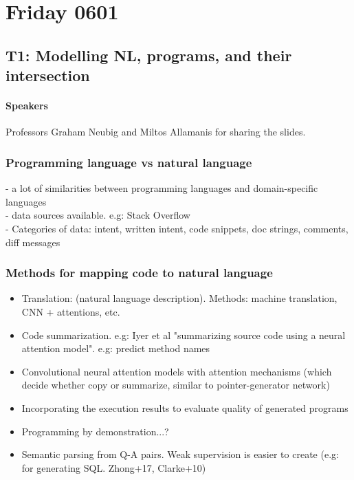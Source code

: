 
\section{Friday 0601}

\subsection{T1: Modelling NL, programs, and their intersection}

\paragraph{Speakers} Professors Graham Neubig and Miltos Allamanis for sharing the slides.

\subsubsection{Programming language vs natural language}
- a lot of similarities between programming languages and domain-specific languages \\
- data sources available. e.g: Stack Overflow\\
- Categories of data: intent, written intent, code snippets, doc strings, comments, diff messages\\


\subsubsection{Methods for mapping code to natural language}
\begin{itemize}
	\item Translation: (natural language description). Methods: machine translation, CNN + attentions, etc.
	\item Code summarization. e.g: Iyer et al "summarizing source code using a neural attention model". e.g: predict method names
	\item Convolutional neural attention models with attention mechanisms (which decide whether copy or summarize, similar to pointer-generator network)
	\item Incorporating the execution results to evaluate quality of generated programs
	\item Programming by demonstration...?
	\item Semantic parsing from Q-A pairs. Weak supervision is easier to create (e.g: for generating SQL. Zhong+17, Clarke+10)
\end{itemize}

